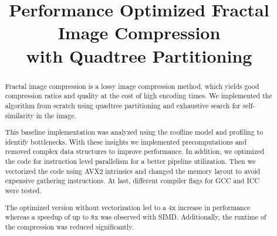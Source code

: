 \documentclass[letterpaper]{article}
\title{Performance Optimized Fractal Image Compression\\with Quadtree Partitioning}
\begin{document}
%
\maketitle
%
%

\setlength{\abovedisplayskip}{1.5ex}
\setlength{\belowdisplayskip}{1.5ex}

\begin{abstract}
  Fractal image compression is a lossy image compression method, which yields
  good compression ratios and quality at the cost of high encoding times. We
  implemented the algorithm from scratch using quadtree partitioning and
  exhaustive search for self-similarity in the image.

  This baseline implementation was analyzed using the roofline model and
  profiling to identify bottlenecks. With these insights we implemented
  precomputations and removed complex data structures to improve performance. In
  addition, we optimized the code for instruction level parallelism
  for a better pipeline utilization. Then we vectorized the code
  using AVX2 intrinsics and changed the memory layout to avoid expensive
  gathering instructions. At last, different compiler flags for GCC and ICC were
  tested.

  The optimized version without vectorization led to a 4x increase in
  performance whereas a speedup of up to 8x was observed with SIMD.
  Additionally, the runtime of the compression was reduced significantly.

\end{abstract}










\end{document}
